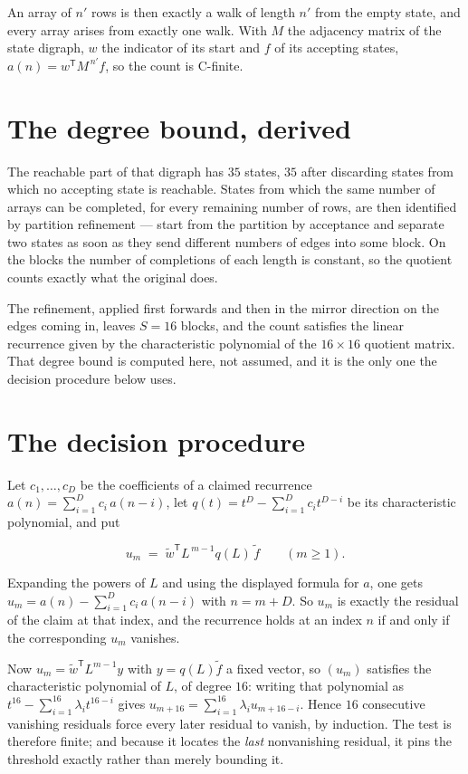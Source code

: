 \documentclass[11pt]{article}
\theoremstyle{definition}
\begin{document}
An array of $n'$ rows is then exactly a walk of length $n'$ from the empty state, and every array arises from exactly one walk. With $M$ the adjacency matrix of the state digraph, $w$ the indicator of its start and $f$ of its accepting states, $a(n) = w^{\mathsf T}M^{\,n'}f$, so the count is C-finite.

\section{The degree bound, derived}

The reachable part of that digraph has $35$ states, $35$ after discarding states from which no accepting state is reachable. States from which the same number of arrays can be completed, for every remaining number of rows, are then identified by partition refinement --- start from the partition by acceptance and separate two states as soon as they send different numbers of edges into some block. On the blocks the number of completions of each length is constant, so the quotient counts exactly what the original does.

The refinement, applied first forwards and then in the mirror direction on the edges coming in, leaves $S = 16$ blocks, and the count satisfies the linear recurrence given by the characteristic polynomial of the $16 \times 16$ quotient matrix. That degree bound is computed here, not assumed, and it is the only one the decision procedure below uses.

\section{The decision procedure}

Let $c_1,\dots,c_D$ be the coefficients of a claimed recurrence $a(n) = \sum_{i=1}^{D} c_i\,a(n-i)$, let $q(t) = t^{D} - \sum_{i=1}^{D} c_i t^{D-i}$ be its characteristic polynomial, and put

\[u_m \;=\; \tilde w^{\mathsf T} L^{\,m-1} q(L)\,\tilde f \qquad (m \ge 1).\]

Expanding the powers of $L$ and using the displayed formula for $a$, one gets $u_m = a(n) - \sum_{i=1}^{D} c_i\,a(n-i)$ with $n = m + D$. So $u_m$ is exactly the residual of the claim at that index, and the recurrence holds at an index $n$ if and only if the corresponding $u_m$ vanishes.

Now $u_m = \tilde w^{\mathsf T} L^{m-1} y$ with $y = q(L)\tilde f$ a fixed vector, so $(u_m)$ satisfies the characteristic polynomial of $L$, of degree $16$: writing that polynomial as $t^{16} - \sum_{i=1}^{16} \lambda_i t^{16-i}$ gives $u_{m+16} = \sum_{i=1}^{16} \lambda_i u_{m+16-i}$. Hence $16$ consecutive vanishing residuals force every later residual to vanish, by induction. The test is therefore finite; and because it locates the {\itshape last} nonvanishing residual, it pins the threshold exactly rather than merely bounding it.
\end{document}
